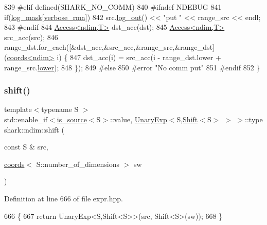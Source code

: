 \begin{DoxyCode}
839 \textcolor{preprocessor}{#elif defined(SHARK\_NO\_COMM)}
840 \textcolor{preprocessor}{#ifndef NDEBUG}
841     \textcolor{keywordflow}{if}(\hyperlink{namespaceshark_a110e03e8104b06caef346fcc25621aa9}{log\_mask}[\hyperlink{namespaceshark_a8faafcaa495b6cf0c0eca37a846e45f2}{verbose\_rma}])
842         src.\hyperlink{classshark_1_1ndim_1_1_global_array_ae56b93f4ac19003102749015275a6d0c}{log\_out}() << \textcolor{stringliteral}{"put "} << range\_src << endl;
843 \textcolor{preprocessor}{#endif}
844     \hyperlink{classshark_1_1ndim_1_1_access}{Access<ndim,T>} dst\_acc(dst);
845     \hyperlink{classshark_1_1ndim_1_1_access}{Access<ndim,T>} src\_acc(src);
846     range\_dst.for\_each([&dst\_acc,&src\_acc,&range\_src,&range\_dst](\hyperlink{structshark_1_1ndim_1_1coords}{coords<ndim>} i) \{
847             dst\_acc(i) = src\_acc(i - range\_dst.lower + range\_src.\hyperlink{structshark_1_1ndim_1_1coords__range_a46cae2c424d7b20f911a970c92581b19}{lower});
848             \});
849 \textcolor{preprocessor}{#else}
850 \textcolor{preprocessor}{#error "No comm put"}
851 \textcolor{preprocessor}{#endif}
852 \}
\end{DoxyCode}
\hypertarget{namespaceshark_1_1ndim_a22800ad79a4648e95fe28d89414e950f}{}\label{namespaceshark_1_1ndim_a22800ad79a4648e95fe28d89414e950f} 
\subsubsection{\texorpdfstring{shift()}{shift()}\hspace{0.1cm}{\footnotesize\ttfamily [1/2]}}
{\footnotesize\ttfamily template$<$typename S $>$ \\
std\+::enable\+\_\+if$<$\hyperlink{classshark_1_1ndim_1_1is__source}{is\+\_\+source}$<$S$>$\+::value, \hyperlink{classshark_1_1ndim_1_1_unary_exp}{Unary\+Exp}$<$S,\hyperlink{classshark_1_1ndim_1_1_shift}{Shift}$<$S$>$ $>$ $>$\+::type shark\+::ndim\+::shift (\begin{DoxyParamCaption}\item[{const S \&}]{src,  }\item[{\hyperlink{structshark_1_1ndim_1_1coords}{coords}$<$ S\+::number\+\_\+of\+\_\+dimensions $>$}]{sw }\end{DoxyParamCaption})}



Definition at line 666 of file expr.\+hpp.


\begin{DoxyCode}
666                                                                                                            
                            \{
667             \textcolor{keywordflow}{return} UnaryExp<S,Shift<S>>(src, Shift<S>(sw));
668         \}
\end{DoxyCode}
\hypertarget{namespaceshark_1_1ndim_afd5a6adf0ff010016f1513b83a0dd813}{}\label{namespaceshark_1_1ndim_afd5a6adf0ff010016f1513b83a0dd813} 
